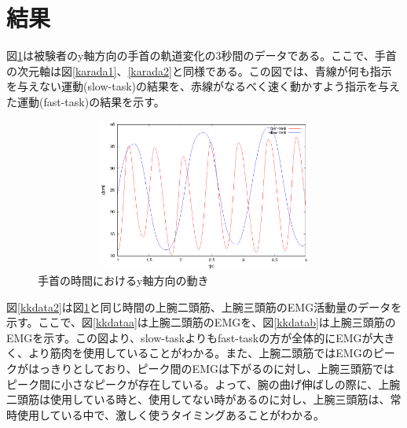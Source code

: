 \documentclass{jsarticle}
\begin{document}

\section{結果}
図\ref{tym3}は被験者のy軸方向の手首の軌道変化の3秒間のデータである。ここで、手首の次元軸は図\ref{karada1}、\ref{karada2}と同様である。この図では、青線が何も指示を与えない運動(slow-task)の結果を、赤線がなるべく速く動かすよう指示を与えた運動(fast-task)の結果を示す。


\begin{figure}[htb]
  \begin{center}
    \includegraphics[width=14cm,height=5cm]{tym3.eps}
    \caption{手首の時間におけるy軸方向の動き}
    \label{tym3}
  \end{center}
\end{figure}


\newpage
図\ref{kkdata2}は図\ref{tym3}と同じ時間の上腕二頭筋、上腕三頭筋のEMG活動量のデータを
示す。ここで、図\ref{kkdataa}は上腕二頭筋のEMGを、図\ref{kkdatab}は上腕三頭筋のEMGを示す。この図より、slow-taskよりもfast-taskの方が全体的にEMGが大きく、より筋肉を使用していることがわかる。また、上腕二頭筋ではEMGのピークがはっきりとしており、ピーク間のEMGは下がるのに対し、上腕三頭筋ではピーク間に小さなピークが存在している。よって、腕の曲げ伸ばしの際に、上腕二頭筋は使用している時と、使用してない時があるのに対し、上腕三頭筋は、常時使用している中で、激しく使うタイミングあることがわかる。
\end{document}
